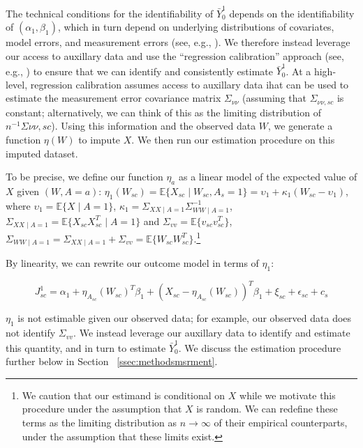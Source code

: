 \documentclass[aoas]{imsart}
\theoremstyle{plain}
\theoremstyle{remark}
\begin{document}
The technical conditions for the identifiability of $\bar{Y}_0^1$ depends on the identifiability of $(\alpha_1, \beta_1)$, which in turn depend on underlying distributions of covariates, model errors, and measurement errors (see, e.g., \cite{cheng1999statistical}). We therefore instead leverage our access to auxillary data and use the ``regression calibration'' approach (see, e.g., \cite{carroll2006measurement}) to ensure that we can identify and consistently estimate $\bar{Y}_0^1$. At a high-level, regression calibration assumes access to auxillary data ihat can be used to estimate the measurement error covariance matrix $\Sigma_{\nu\nu}$ (assuming that $\Sigma_{\nu\nu, sc}$ is constant; alternatively, we can think of this as the limiting distribution of $n^{-1}\Sigma{\nu\nu, sc}$). Using this information and the observed data $W$, we generate a function $\eta(W)$ to impute $X$. We then run our estimation procedure on this imputed dataset. 

To be precise, we define our function $\eta_a$ as a linear model of the expected value of $X$ given $(W, A = a)$: $\eta_1(W_{sc}) = \mathbb{E}\{X_{sc} \mid W_{sc}, A_{s} = 1\} = \upsilon_1 + \kappa_1 (W_{sc} - \upsilon_1)$, where $\upsilon_1 = \mathbb{E}\{X \mid A = 1\}$, $\kappa_1 = \Sigma_{XX \mid A = 1}\Sigma_{WW \mid A = 1}^{-1}$, $\Sigma_{XX \mid A = 1} = \mathbb{E}\{X_{sc}X_{sc}^T \mid A = 1\}$ and $\Sigma_{vv} = \mathbb{E}\{v_{sc}v_{sc}^T\}$, $\Sigma_{WW \mid A = 1} = \Sigma_{XX \mid A = 1} + \Sigma_{vv} = \mathbb{E}\{W_{sc}W_{sc}^T\}$.\footnote{We caution that our estimand is conditional on $X$ while we motivate this procedure under the assumption that $X$ is random. We can redefine these terms as the limiting distribution as $n \to \infty$ of their empirical counterparts, under the assumption that these limits exist.}

By linearity, we can rewrite our outcome model in terms of $\eta_1$:

\begin{equation}
    J_{sc}^1 = \alpha_1 + \eta_{A_{sc}}(W_{sc})^T\beta_1 + (X_{sc} - \eta_{A_{sc}}(W_{sc}))^T\beta_1 + \xi_{sc} + \epsilon_{sc} + c_s 
\end{equation}

$\eta_1$ is not estimable given our observed data; for example, our observed data does not identify $\Sigma_{vv}$. We instead leverage our auxillary data to identify and estimate this quantity, and in turn to estimate $\bar{Y}_0^1$. We discuss the estimation procedure further below in Section ~\ref{ssec:methodsmsrment}.
\end{document}
